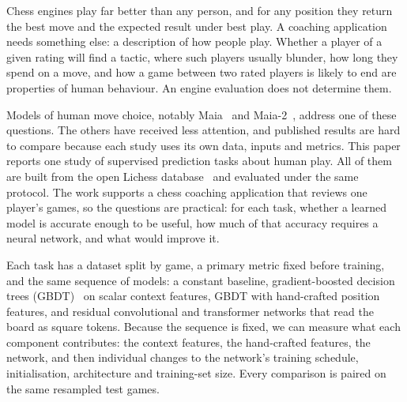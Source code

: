 \documentclass[11pt]{article}
\begin{document}
Chess engines play far better than any person, and for any position they
return the best move and the expected result under best play. A coaching
application needs something else: a description of how people play. Whether a
player of a given rating will find a tactic, where such players usually
blunder, how long they spend on a move, and how a game between two rated
players is likely to end are properties of human behaviour. An engine
evaluation does not determine them.

Models of human move choice, notably Maia~\cite{maia} and
Maia-2~\cite{maia2}, address one of these questions. The others have received
less attention, and published results are hard to compare because each study
uses its own data, inputs and metrics. This paper reports one study of
 supervised prediction tasks about human play. All of them
are built from the open Lichess database~\cite{lichessdb} and evaluated under
the same protocol. The work supports a chess coaching application that
reviews one player's games, so the questions are practical: for each task,
whether a learned model is accurate enough to be useful, how much of that
accuracy requires a neural network, and what would improve it.

Each task has a dataset split by game, a primary metric fixed before training,
and the same sequence of models: a constant baseline, gradient-boosted
decision trees (GBDT)~\cite{lightgbm} on scalar context features, GBDT with
hand-crafted position features, and residual convolutional and transformer
networks that read the board as square tokens. Because the sequence is fixed,
we can measure what each component contributes: the context features, the
hand-crafted features, the network, and then individual changes to the
network's training schedule, initialisation, architecture and training-set
size. Every comparison is paired on the same resampled test games.
\end{document}
